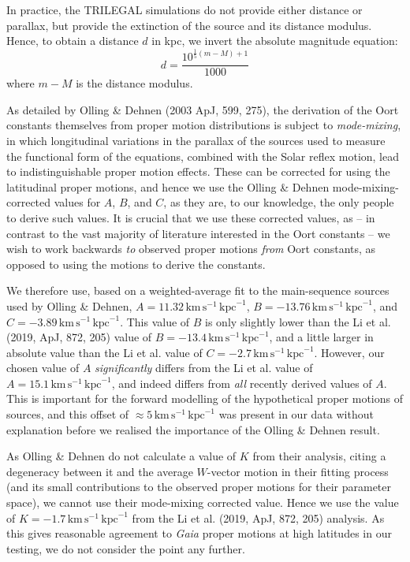 \documentclass[fleqn,usenatbib]{mnras}
\begin{document}
In practice, the TRILEGAL simulations do not provide either distance or parallax, but provide the extinction of the source and its distance modulus. Hence, to obtain a distance $d$ in kpc, we invert the absolute magnitude equation:
\begin{equation}
    d = \frac{10^{\frac{1}{5}(m - M) + 1}}{1000}
\end{equation}
where $m - M$ is the distance modulus.

As detailed by Olling \& Dehnen (2003 ApJ, 599, 275), the derivation of the Oort constants themselves from proper motion distributions is subject to \textit{mode-mixing}, in which longitudinal variations in the parallax of the sources used to measure the functional form of the equations, combined with the Solar reflex motion, lead to indistinguishable proper motion effects. These can be corrected for using the latitudinal proper motions, and hence we use the Olling \& Dehnen mode-mixing-corrected values for $A$, $B$, and $C$, as they are, to our knowledge, the only people to derive such values. It is crucial that we use these corrected values, as -- in contrast to the vast majority of literature interested in the Oort constants -- we wish to work backwards \textit{to} observed proper motions \textit{from} Oort constants, as opposed to using the motions to derive the constants.

We therefore use, based on a weighted-average fit to the main-sequence sources used by Olling \& Dehnen, $A = 11.32\,\mathrm{km}\,\mathrm{s}^{-1}\,\mathrm{kpc}^{-1}$, $B = -13.76\,\mathrm{km}\,\mathrm{s}^{-1}\,\mathrm{kpc}^{-1}$, and $C = -3.89\,\mathrm{km}\,\mathrm{s}^{-1}\,\mathrm{kpc}^{-1}$. This value of $B$ is only slightly lower than the Li et al. (2019, ApJ, 872, 205) value of $B = -13.4\,\mathrm{km}\,\mathrm{s}^{-1}\,\mathrm{kpc}^{-1}$, and a little larger in absolute value than the Li et al. value of $C = -2.7\,\mathrm{km}\,\mathrm{s}^{-1}\,\mathrm{kpc}^{-1}$. However, our chosen value of $A$ \textit{significantly} differs from the Li et al. value of $A = 15.1\,\mathrm{km}\,\mathrm{s}^{-1}\,\mathrm{kpc}^{-1}$, and indeed differs from \textit{all} recently derived values of $A$. This is important for the forward modelling of the hypothetical proper motions of sources, and this offset of $\approx5\,\mathrm{km}\,\mathrm{s}^{-1}\,\mathrm{kpc}^{-1}$ was present in our data without explanation before we realised the importance of the Olling \& Dehnen result.

As Olling \& Dehnen do not calculate a value of $K$ from their analysis, citing a degeneracy between it and the average $W$-vector motion in their fitting process (and its small contributions to the observed proper motions for their parameter space), we cannot use their mode-mixing corrected value. Hence we use the value of $K = -1.7\,\mathrm{km}\,\mathrm{s}^{-1}\,\mathrm{kpc}^{-1}$ from the Li et al. (2019, ApJ, 872, 205) analysis. As this gives reasonable agreement to \textit{Gaia} proper motions at high latitudes in our testing, we do not consider the point any further.
\end{document}

